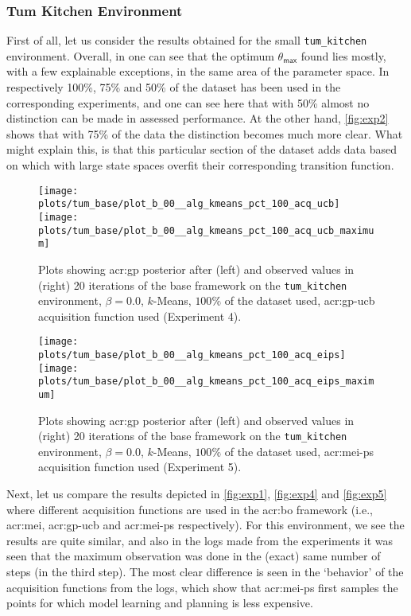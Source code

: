 \subsubsection{Tum Kitchen Environment}

First of all, let us consider the results obtained for the small \texttt{tum\_kitchen} environment.
Overall, in  one can see that the optimum $\theta_\mathsf{max}$ found lies mostly, with a few explainable exceptions, in the same area of the parameter space.
In  respectively 100\%, 75\% and 50\% of the dataset has been used in the corresponding experiments, and one can see here that with 50\% almost no distinction can be made in assessed performance.
At the other hand, \autoref{fig:exp2} shows that with 75\% of the data the distinction becomes much more clear.
What might explain this, is that this particular section of the dataset adds data based on which  with large state spaces overfit their corresponding transition function.

	\begin{figure}
		\centering
		\texttt{[image: plots/tum\_base/plot\_b\_00\_\_alg\_kmeans\_pct\_100\_acq\_ucb]}
		\texttt{[image: plots/tum\_base/plot\_b\_00\_\_alg\_kmeans\_pct\_100\_acq\_ucb\_maximum]}
		\caption{Plots showing \acrshort{acr:gp}  posterior after (left) and observed values in (right) 20 iterations of the base framework on the \texttt{tum\_kitchen} environment, $\beta = 0.0$, $k$-Means, $100\%$ of the dataset used, \acrshort{acr:gp-ucb} acquisition function used (Experiment 4).}
		\label{fig:exp4}
	\end{figure}
	\begin{figure}
		\centering
		\texttt{[image: plots/tum\_base/plot\_b\_00\_\_alg\_kmeans\_pct\_100\_acq\_eips]}
		\texttt{[image: plots/tum\_base/plot\_b\_00\_\_alg\_kmeans\_pct\_100\_acq\_eips\_maximum]}
		\caption{Plots showing \acrshort{acr:gp} posterior after (left) and observed values in (right) 20 iterations of the base framework on the \texttt{tum\_kitchen} environment, $\beta = 0.0$, $k$-Means, $100\%$ of the dataset used, \acrshort{acr:mei-ps} acquisition function used (Experiment 5).}
		\label{fig:exp5}
	\end{figure}

Next, let us compare the results depicted in \autoref{fig:exp1}, \autoref{fig:exp4} and \autoref{fig:exp5} where different acquisition functions are used in the \acrshort{acr:bo} framework (i.e., \acrshort{acr:mei}, \acrshort{acr:gp-ucb} and \acrshort{acr:mei-ps} respectively).
For this environment, we see the results are quite similar, and also in the logs made from the experiments it was seen that the maximum observation was done in the (exact) same number of steps (in the third step).
The most clear difference is seen in the `behavior' of the acquisition functions from the logs, which show that \acrshort{acr:mei-ps} first samples the points for which model learning and planning is less expensive.

